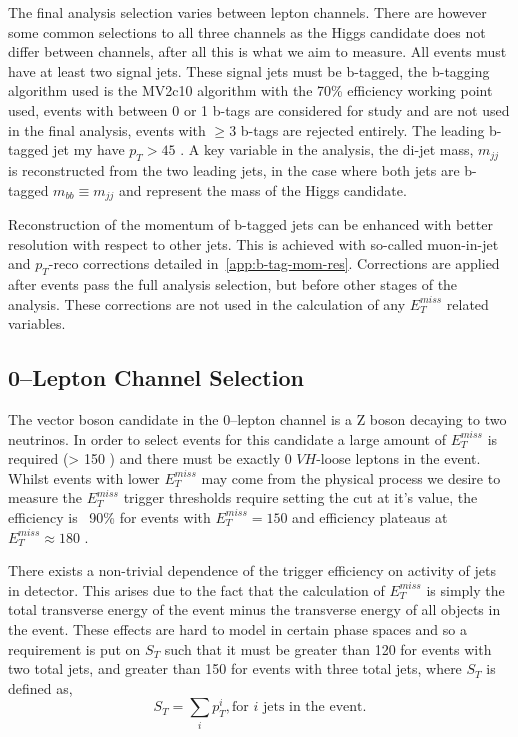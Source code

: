 The final analysis selection varies between lepton channels. There are however
some common selections to all three channels as the Higgs candidate does not
differ between channels, after all this is what we aim to measure. All events must
have at least two signal jets. These signal jets must be b-tagged, the b-tagging
algorithm used is the MV2c10 algorithm with the 70\% efficiency working point
used, events with between 0 or 1 b-tags are considered for study and are not
used in the final analysis, events with $\ge3$ b-tags are rejected entirely. The
leading b-tagged jet my have $p_T > 45$ \GeV. A key variable in the analysis, the
di-jet mass, $m_{jj}$ is reconstructed from the two leading jets, in the case
where both jets are b-tagged $m_{bb} \equiv m_{jj}$ and represent the mass of
the Higgs candidate.

Reconstruction of the momentum of b-tagged jets can be enhanced with better
resolution with respect to other jets. This is achieved with so-called
muon-in-jet and $p_T$-reco corrections detailed in~\ref{app:b-tag-mom-res}.
Corrections are applied after events pass the full analysis selection, but
before other stages of the analysis. These corrections are not used in the
calculation of any $E_T^{miss}$ related variables.

\subsection{0--Lepton Channel Selection}
\label{sec:0lep-selection}

The vector boson candidate in the 0--lepton channel is a Z boson decaying to two
neutrinos. In order to select events for this candidate a large amount of
$E_T^{miss}$ is required (> 150 \GeV) and there must be exactly 0 $VH$-loose
leptons in the event. Whilst events with lower $E_T^{miss}$ may come from the
physical process we desire to measure the $E_T^{miss}$ trigger thresholds
require setting the cut at it's value, the efficiency is ~90\% for events
with $E_T^{miss} = 150$ \GeV and efficiency plateaus at $E_T^{miss} \approx 180$
\GeV.

There exists a non-trivial dependence of the trigger efficiency on activity of
jets in detector. This arises due to the fact that the calculation of
$E_T^{miss}$ is simply the total transverse energy of the event minus the
transverse energy of all objects in the event. These effects are hard to model
in certain phase spaces and so a requirement is put on $S_T$ such that it must
be greater than 120 \GeV for events with two total jets, and greater than 150 \GeV
for events with three total jets, where $S_T$ is defined as,
\begin{equation}
  S_T = \sum_i p_T^i, \text{for } i \text{ jets in the event.}
\end{equation}

